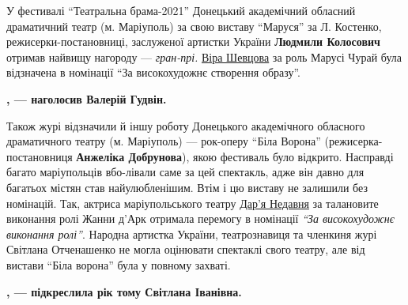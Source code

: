 У фестивалі \enquote{Театральна брама-2021} Донецький академічний обласний
драматичний театр (м. Маріуполь) за свою виставу \enquote{Маруся} за Л.
Костенко, режисерки-постановниці, заслуженої артистки України \textbf{Людмили Колосович}
отримав найвищу нагороду — \emph{гран-прі.}
\href{https://www.facebook.com/profile.php?id=100023187227038}{Віра Шевцова} за
роль Марусі Чурай була відзначена в номінації \enquote{За високохудожнє
створення образу}.



\begin{leftbar}
	\begingroup
		\bfseries
{}, — наголосив Валерій Гудвін.
	\endgroup
\end{leftbar}

Також журі відзначили й іншу роботу Донецького академічного обласного
драматичного театру (м. Маріуполь) — рок-оперу \enquote{Біла Ворона}
(режисерка-постановниця \textbf{Анжеліка Добрунова}), якою фестиваль було відкрито.
Насправді багато маріупольців вбо\hyp{}лівали саме за цей спектакль, адже він давно
для багатьох містян став найулюбленішим. Втім і цю виставу не залишили без
номінацій. Так, актриса маріупольського театру \href{https://www.facebook.com/profile.php?id=100028732189242}{Дар'я Недавня} за талановите
виконання ролі Жанни д'Арк отримала перемогу в номінації \emph{\enquote{За високохудожнє
виконання ролі}}. Народна артистка України, театрознавиця та членкиня журі
Світлана Отченашенко не могла оцінювати спектаклі свого театру, але від вистави
\enquote{Біла ворона} була у повному захваті. 


\begin{leftbar}
	\begingroup
		\bfseries
{}, — підкреслила рік тому Світлана Іванівна.
	\endgroup
\end{leftbar}


